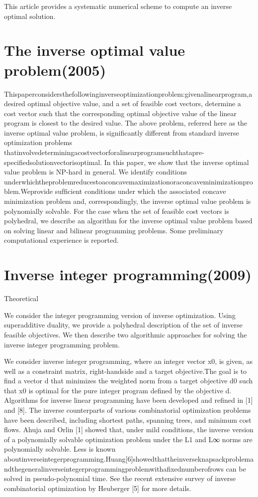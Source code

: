 \documentclass[UTF8]{article}
\begin{document}
This article provides a systematic numerical scheme to compute an inverse optimal solution.



\section{The inverse optimal value problem(2005)}

Thispaperconsidersthefollowinginverseoptimizationproblem:givenalinearprogram,adesired optimal objective value, and a set of feasible cost vectors, determine a cost vector such that the corresponding optimal objective value of the linear program is closest to the desired value.
The above problem, referred here as the inverse optimal value problem, is signiﬁcantly different from standard inverse optimization problems thatinvolvedeterminingacostvectorforalinearprogramsuchthatapre-speciﬁedsolutionvectorisoptimal. In this paper, we show that the inverse optimal value problem is NP-hard in general. We identify conditions underwhichtheproblemreducestoaconcavemaximizationoraconcaveminimizationproblem.Weprovide sufﬁcient conditions under which the associated concave minimization problem and, correspondingly, the inverse optimal value problem is polynomially solvable. For the case when the set of feasible cost vectors is polyhedral, we describe an algorithm for the inverse optimal value problem based on solving linear and bilinear programming problems. Some preliminary computational experience is reported.


\section{Inverse integer programming(2009)}

Theoretical

We consider the integer programming version of inverse optimization. Using superadditive duality, we provide a polyhedral description of the set of inverse feasible objectives. We then describe two algorithmic approaches for solving the inverse integer programming problem.

We consider inverse integer programming, where an integer vector x0, is given, as well as a constraint matrix, right-handside and a target objective.The goal is to ﬁnd a vector d that minimizes the weighted norm from a target objective d0 such that x0 is optimal for the pure integer program deﬁned by the objective d. Algorithms for inverse linear programming have been developed and reﬁned in [1] and [8]. The inverse counterparts of various combinatorial optimization problems have been described, including shortest paths, spanning trees, and minimum cost flows. Ahuja and Orlin [1] showed that, under mild conditions, the inverse version of a polynomially solvable optimization problem under the L1 and L∞ norms are polynomially solvable. Less is known aboutinverseintegerprogramming.Huang[6]showedthattheinverseknapsackproblemandthegeneralinverseintegerprogrammingproblemwithaﬁxednumberofrows can be solved in pseudo-polynomial time. See the recent extensive survey of inverse combinatorial optimization by Heuberger [5] for more details.
\end{document}
